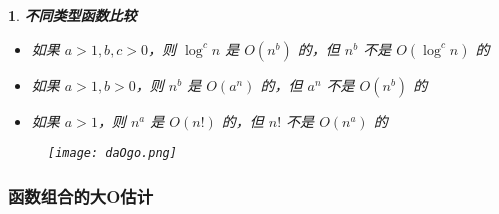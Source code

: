 \documentclass[UTF8]{report}
\theoremstyle{MyLineTheoremStyle} %
\theoremstyle{MyBlockTheoremStyle} %
\theoremstyle{MySubsubsectionStyle} %
\newtheorem{definition}{}
\begin{document}
\begin{definition}
    \textbf{不同类型函数比较}
    \begin{itemize}
        \item 如果 $a > 1, b, c > 0$，则 $\log^c n$ 是 $O(n^b)$ 的，但 $n^b$ 不是 $O(\log^c n)$ 的
        \item 如果 $a > 1, b > 0$，则 $n^b$ 是 $O(a^n)$ 的，但 $a^n$ 不是 $O(n^b)$ 的
        \item 如果 $a > 1$，则 $n^a$ 是 $O(n!)$ 的，但 $n!$ 不是 $O(n^a)$ 的
    \end{itemize}

    \begin{figure}[ht]
        \centering
        \texttt{[image: daOgo.png]}
    \end{figure}
\end{definition}

\subsubsection{函数组合的大O估计}
\end{document}
